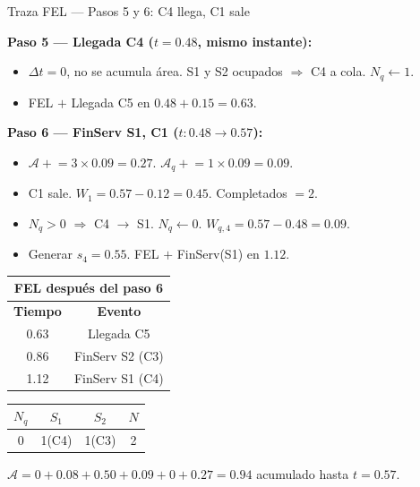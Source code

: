 \documentclass[aspectratio=1610, 9pt]{beamer}
\begin{document}
\begin{frame}{Traza FEL --- Pasos 5 y 6: C4 llega, C1 sale}

\small
\textbf{Paso 5 --- Llegada C4 ($t = 0.48$, mismo instante):}
\begin{itemize}
    \item $\Delta t = 0$, no se acumula área. S1 y S2 ocupados $\Rightarrow$ C4 a cola. $N_q \leftarrow 1$.
    \item \textcolor{verdeoscuro}{FEL $+$} Llegada C5 en $0.48 + 0.15 = 0.63$.
\end{itemize}

\textbf{Paso 6 --- FinServ S1, C1 ($t: 0.48 \to 0.57$):}
\begin{itemize}
    \item $\mathcal{A} \mathrel{+}= 3 \times 0.09 = 0.27$. \; $\mathcal{A}_q \mathrel{+}= 1 \times 0.09 = 0.09$.
    \item C1 sale. $W_1 = 0.57 - 0.12 = 0.45$. Completados $= 2$.
    \item $N_q > 0$ $\Rightarrow$ C4 $\to$ S1. $N_q \leftarrow 0$. $W_{q,4} = 0.57 - 0.48 = 0.09$.
    \item Generar $s_4 = 0.55$. \textcolor{verdeoscuro}{FEL $+$} FinServ(S1) en $1.12$.
\end{itemize}

\vspace{0.15cm}
\begin{center}
\renewcommand{\arraystretch}{1.3}
\begin{tabular}{|c|c|}
\hline
\multicolumn{2}{|c|}{\cellcolor{azuloscuro!15}\textbf{FEL después del paso 6}} \\
\hline
\textbf{Tiempo} & \textbf{Evento} \\
\hline
\rowcolor{yellow!20} 0.63 & Llegada C5 \\
0.86 & FinServ S2 (C3) \\
1.12 & FinServ S1 (C4) \\
\hline
\end{tabular}
\hspace{1cm}
\begin{tabular}{|c|c|c|c|}
\hline
$N_q$ & $S_1$ & $S_2$ & $N$ \\
\hline
0 & 1(C4) & 1(C3) & 2 \\
\hline
\end{tabular}
\end{center}

$\mathcal{A} = 0 + 0.08 + 0.50 + 0.09 + 0 + 0.27 = 0.94$ acumulado hasta $t = 0.57$.
\end{frame}
\end{document}
